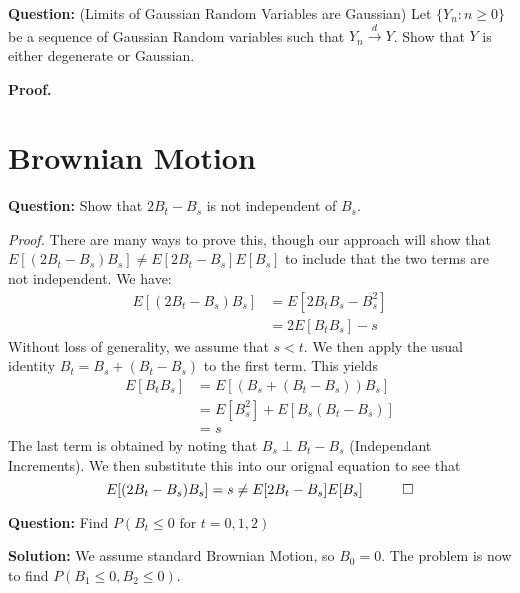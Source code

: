 \documentclass{article}
\begin{document}
\begin{tcolorbox}[colframe=black,colback=gray!5,boxrule=0.5pt]
\textbf{Question:} (Limits of Gaussian Random Variables are Gaussian) Let $\{Y_n:n\geq 0\}$ be a sequence of Gaussian Random variables such that $Y_n\stackrel{d}{\to} Y$. Show that $Y$ is either degenerate or Gaussian. 
\end{tcolorbox}
\textbf{Proof.}

\newpage
\section{Brownian Motion}

\begin{tcolorbox}[colframe=black,colback=gray!5,boxrule=0.5pt]
\textbf{Question:} Show that $2B_{t} - B_s$ is not independent of $B_s$. \cite{Fima}
\end{tcolorbox}
\textit{Proof.} There are many ways to prove this, though our approach will show that $E[(2B_t-B_s)B_s]\neq E[2B_t-B_s] E[B_s]$ to include that the two terms are not independent. We have: 
\begin{align*}
    E[(2B_t-B_s)B_s] &= E[2B_tB_s - B_s^2] \\
    &= 2E[B_t B_s] - s
\end{align*}
Without loss of generality, we assume that $s<t$. We then apply the usual identity $B_t = B_s + (B_t - B_s)$ to the first term. This yields
\begin{align*}
    E[B_t B_s] &= E[(B_s + (B_t - B_s))B_s] \\
    &=E[B_s^2] + E[B_s(B_t - B_s)] \\
    &= s
\end{align*}
The last term is obtained by noting that $B_s \perp B_{t} - B_s$ (Independant Increments). We then substitute this into our orignal equation to see that 
$$E[(2B_t-B_s)B_s] = s \neq E[2B_t-B_s]E[B_s] \hspace{10mm} \Box$$

\vspace{2mm}

\begin{tcolorbox}[colframe=black,colback=gray!5,boxrule=0.5pt]
\textbf{Question:} Find $P(B_t\leq0\text{ for } t=0,1,2)$ \cite{Fima}
\end{tcolorbox}
\textbf{Solution:} We assume standard Brownian Motion, so $B_0=0$. The problem is now to find $P(B_1\leq0, B_2\leq0)$.


\vspace{2mm}
\end{document}
